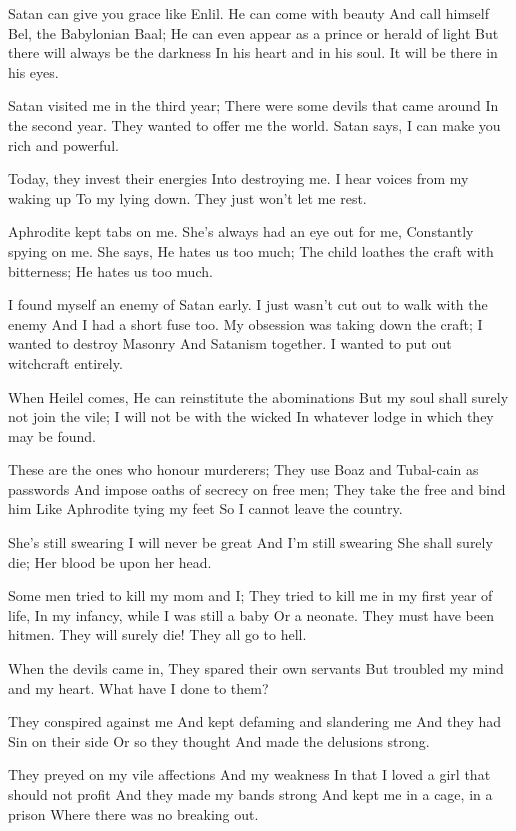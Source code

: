 \documentclass[
]{book}
\begin{document}
Satan can give you grace like Enlil.
He can come with beauty
And call himself Bel, the Babylonian Baal;
He can even appear as a prince or herald of light
But there will always be the darkness
In his heart and in his soul.
It will be there in his eyes.

Satan visited me in the third year;
There were some devils that came around
In the second year.
They wanted to offer me the world.
Satan says, I can make you rich and powerful.

Today, they invest their energies
Into destroying me.
I hear voices from my waking up
To my lying down.
They just won't let me rest.

Aphrodite kept tabs on me.
She's always had an eye out for me,
Constantly spying on me.
She says, He hates us too much;
The child loathes the craft with bitterness;
He hates us too much.

I found myself an enemy of Satan early.
I just wasn't cut out to walk with the enemy
And I had a short fuse too.
My obsession was taking down the craft;
I wanted to destroy Masonry
And Satanism together.
I wanted to put out witchcraft entirely.

When Heilel comes,
He can reinstitute the abominations
But my soul shall surely not join the vile;
I will not be with the wicked
In whatever lodge in which they may be found.

These are the ones who honour murderers;
They use Boaz and Tubal-cain as passwords
And impose oaths of secrecy on free men;
They take the free and bind him
Like Aphrodite tying my feet
So I cannot leave the country.

She's still swearing I will never be great
And I'm still swearing
She shall surely die;
Her blood be upon her head.

Some men tried to kill my mom and I;
They tried to kill me in my first year of life,
In my infancy, while I was still a baby
Or a neonate.
They must have been hitmen.
They will surely die!
They all go to hell.

When the devils came in,
They spared their own servants
But troubled my mind and my heart.
What have I done to them?

They conspired against me
And kept defaming and slandering me
And they had Sin on their side
Or so they thought
And made the delusions strong.

They preyed on my vile affections
And my weakness
In that I loved a girl that should not profit
And they made my bands strong
And kept me in a cage, in a prison
Where there was no breaking out.
\end{document}
